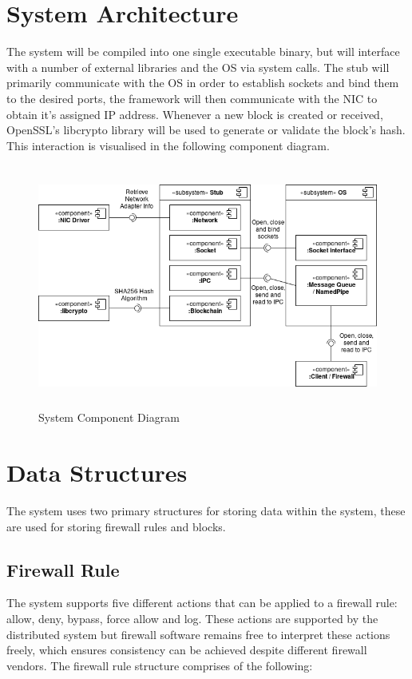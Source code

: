 \documentclass[a4paper, 11pt]{report}
\begin{document}
\section{System Architecture}
The system will be compiled into one single executable binary, but will interface with a number of external libraries and the \acrshort{OS} via system calls. The stub will primarily communicate with the \acrshort{OS} in order to establish sockets and bind them to the desired ports, the framework will then communicate with the \acrfull{NIC} to obtain it's assigned \acrfull{IP} address. Whenever a new block is created or received, OpenSSL's libcrypto library \cite{libcrypto} will be used to generate or validate the block's hash. This interaction is visualised in the following component diagram.

\begin{figure}[H]
\centering
\includegraphics[height=8cm,keepaspectratio]{componentdiagram}
\caption{System Component Diagram} 
\label{fig:comp}
\end{figure}

\section{Data Structures}
The system uses two primary structures for storing data within the system, these are used for storing firewall rules and blocks.

\subsection{Firewall Rule} \label{rule}
The system supports five different actions that can be applied to a firewall rule: allow, deny, bypass, force allow and log.  These actions are supported by the distributed system but firewall software remains free to interpret these actions freely, which ensures consistency can be achieved despite different firewall vendors.
The firewall rule structure comprises of the following:
\end{document}
